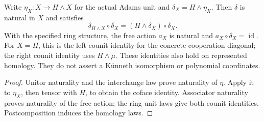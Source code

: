 \begin{proposition}
  \label{prop:h6-coaction-identities}
  \leanok
  Write $\eta_X:X\to H\wedge X$ for the actual Adams unit and
  $\delta_X=H\wedge\eta_X$. Then $\delta$ is natural in $X$ and satisfies
  \[
    \delta_{H\wedge X}\circ\delta_X
      =(H\wedge\delta_X)\circ\delta_X.
  \]
  With the specified ring structure, the free action $a_X$ is natural and
  $a_X\circ\delta_X=\operatorname{id}$. For $X=H$, this is the left
  counit identity for the concrete cooperation diagonal; the right counit
  identity uses $H\wedge\mu$. These identities also hold on represented
  homology. They do not assert a K\"unneth isomorphism or polynomial coordinates.
\end{proposition}
\begin{proof}
  Unitor naturality and the interchange law prove naturality of $\eta$.
  Apply it to $\eta_X$, then tensor with $H$, to obtain the coface identity.
  Associator naturality proves naturality of the free action; the ring unit
  laws give both counit identities. Postcomposition induces the homology laws.
  \leanok
\end{proof}

